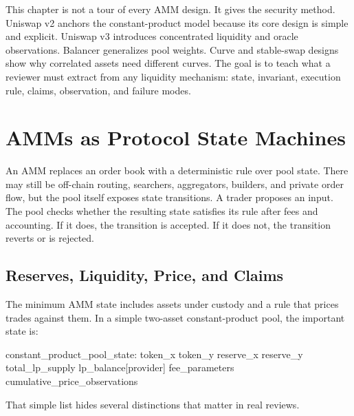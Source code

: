 This chapter is not a tour of every AMM design. It gives the security method. Uniswap v2 anchors the constant-product model because its core design is simple and explicit. Uniswap v3 introduces concentrated liquidity and oracle observations. Balancer generalizes pool weights. Curve and stable-swap designs show why correlated assets need different curves. The goal is to teach what a reviewer must extract from any liquidity mechanism: state, invariant, execution rule, claims, observation, and failure modes.

\section{AMMs as Protocol State Machines}

An AMM replaces an order book with a deterministic rule over pool state. There may still be off-chain routing, searchers, aggregators, builders, and private order flow, but the pool itself exposes state transitions. A trader proposes an input. The pool checks whether the resulting state satisfies its rule after fees and accounting. If it does, the transition is accepted. If it does not, the transition reverts or is rejected.

\subsection{Reserves, Liquidity, Price, and Claims}

The minimum AMM state includes assets under custody and a rule that prices trades against them. In a simple two-asset constant-product pool, the important state is:

\begin{codeblock}
constant_product_pool_state:
    token_x
    token_y
    reserve_x
    reserve_y
    total_lp_supply
    lp_balance[provider]
    fee_parameters
    cumulative_price_observations
\end{codeblock}

That simple list hides several distinctions that matter in real reviews.

